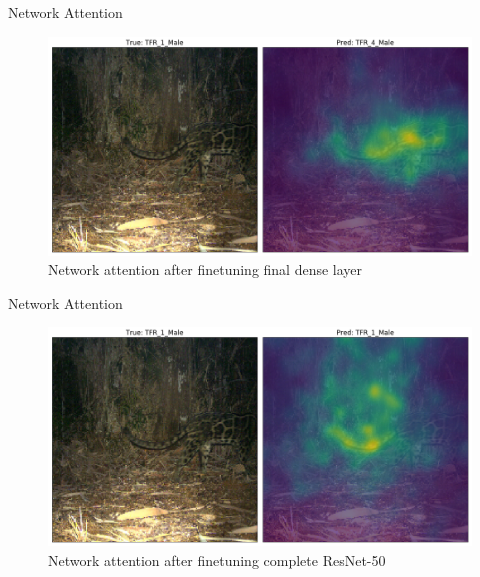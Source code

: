 \documentclass[10pt]{beamer}
\begin{document}
\begin{frame}{Network Attention}
	\centering
	\begin{figure}
		\includegraphics[width=\columnwidth]{images/finetune_Attention.png}
		\caption{Network attention after finetuning final dense layer}
	\end{figure}
\end{frame}


\begin{frame}{Network Attention}
	\centering
	\begin{figure}
		\includegraphics[width=\columnwidth]{images/finetune_Attention_later.png}
		\caption{Network attention after finetuning complete ResNet-50}
	\end{figure}
\end{frame}

%		
%		
%		
%		


{\1
\begin{frame}
\end{frame}}
\end{document}
